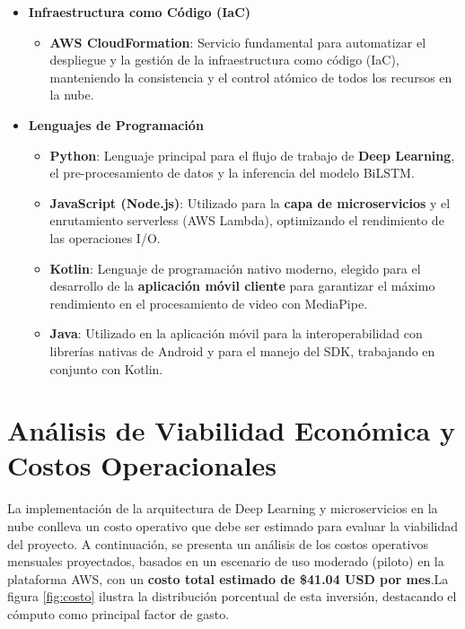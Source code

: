 \begin{itemize}[nosep, itemsep=0.7pt]
    \item \textbf{Infraestructura como Código (IaC)}
    \begin{itemize}[nosep, itemsep=0pt]
        \item \textbf{AWS CloudFormation}: Servicio fundamental para automatizar el despliegue y la gestión de la infraestructura como código (IaC), manteniendo la consistencia y el control atómico de todos los recursos en la nube.
    \end{itemize}
    \item \textbf{Lenguajes de Programación}
    \begin{itemize}[nosep, itemsep=0pt]
        \item \textbf{Python}: Lenguaje principal para el flujo de trabajo de \textbf{Deep Learning}, el pre-procesamiento de datos y la inferencia del modelo BiLSTM.
        \item \textbf{JavaScript (Node.js)}: Utilizado para la \textbf{capa de microservicios} y el enrutamiento serverless (AWS Lambda), optimizando el rendimiento de las operaciones I/O.
        \item \textbf{Kotlin}: Lenguaje de programación nativo moderno, elegido para el desarrollo de la \textbf{aplicación móvil cliente} para garantizar el máximo rendimiento en el procesamiento de video con MediaPipe.
        \item \textbf{Java}: Utilizado en la aplicación móvil para la interoperabilidad con librerías nativas de Android y para el manejo del SDK, trabajando en conjunto con Kotlin.
    \end{itemize}
\end{itemize}
\clearpage

\section{Análisis de Viabilidad Económica y Costos Operacionales}
La implementación de la arquitectura de Deep Learning y microservicios en la nube conlleva un costo operativo que debe ser estimado para evaluar la viabilidad del proyecto. A continuación, se presenta un análisis de los costos operativos mensuales proyectados, basados en un escenario de uso moderado (piloto) en la plataforma AWS, con un \textbf{costo total estimado de \$41.04 USD por mes}.La figura \ref{fig:costo} ilustra la distribución porcentual de esta inversión, destacando el cómputo como principal factor de gasto.

